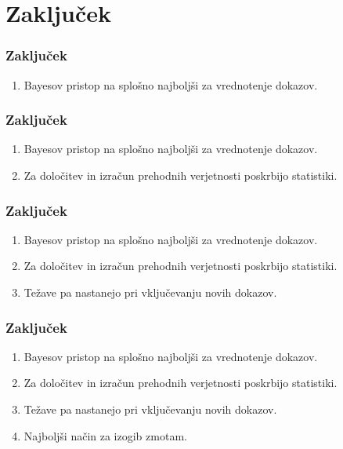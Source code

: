 \documentclass{beamer}
\begin{document}
\section{Zaključek}

\begin{frame}
   \frametitle{Zaključek}
   \begin{enumerate}
      \item Bayesov pristop na splošno najboljši za vrednotenje dokazov.
   \end{enumerate}
\end{frame}

\begin{frame}
   \frametitle{Zaključek}
   \begin{enumerate}
      \item Bayesov pristop na splošno najboljši za vrednotenje dokazov.
      \item Za določitev in izračun prehodnih verjetnosti poskrbijo statistiki.
   \end{enumerate}
\end{frame}

\begin{frame}
   \frametitle{Zaključek}
   \begin{enumerate}
      \item Bayesov pristop na splošno najboljši za vrednotenje dokazov.
      \item Za določitev in izračun prehodnih verjetnosti poskrbijo statistiki.
      \item Težave pa nastanejo pri vključevanju novih dokazov.
   \end{enumerate}
\end{frame}

\begin{frame}
   \frametitle{Zaključek}
   \begin{enumerate}
      \item Bayesov pristop na splošno najboljši za vrednotenje dokazov.
      \item Za določitev in izračun prehodnih verjetnosti poskrbijo statistiki.
      \item Težave pa nastanejo pri vključevanju novih dokazov.
      \item Najboljši način za izogib zmotam.
   \end{enumerate}
\end{frame}
\end{document}
